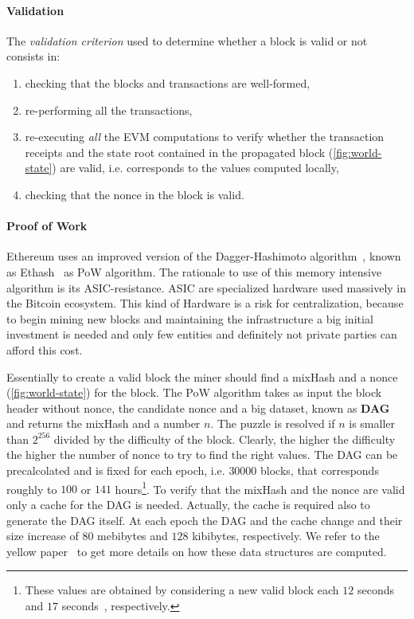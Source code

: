 \paragraph{Validation}
The \emph{validation criterion} used to determine whether a block is valid or
not consists in:
\begin{enumerate}
    \item checking that the blocks and transactions are well-formed,
    \item re-performing all the transactions,
    \item re-executing \emph{all} the EVM computations to verify whether the
    transaction receipts and the state root contained in the propagated block
    (\autoref{fig:world-state}) are valid, i.e. corresponds to the values
    computed locally,
    \item checking that the nonce in the block is valid.
\end{enumerate}

\paragraph{Proof of Work}
Ethereum uses an improved version of the
Dagger-Hashimoto algorithm~\cite{bib:dagger-hashimoto}, known as
Ethash~\cite[Appendix J]{wood2018ethereum} as PoW algorithm.
The rationale to use of this memory intensive algorithm is its
ASIC-resistance. ASIC are specialized hardware used massively in the Bitcoin
ecosystem. This kind of Hardware is a risk for centralization,
because to begin mining new blocks and maintaining the infrastructure a big
initial investment is needed and only few entities and definitely not private
parties can afford this cost.

Essentially to create a valid block the miner should find a mixHash and
a nonce (\autoref{fig:world-state}) for the block.
The PoW algorithm takes as input the block header without nonce,
the candidate nonce and a big dataset, known as \textbf{DAG} and
returns the mixHash and a number $n$. The puzzle is resolved if
$n$ is smaller than $2^{256}$ divided by the difficulty of the block. Clearly,
the higher the difficulty the higher the number of nonce to try to find the
right values. The DAG can be precalcolated and is fixed for each epoch, i.e.
$30000$ blocks, that corresponds roughly to $100$ or $141$ hours\footnote{
These values are obtained by considering a new valid block each $12$
seconds~\cite{bib:} and $17$ seconds~\cite{bib:solidity}, respectively.}. To
verify that the mixHash and the nonce are valid only a cache for the DAG is
needed. Actually, the cache is required also to generate the DAG itself.
At each epoch the DAG and the cache change and their size increase of
$80$ mebibytes and $128$ kibibytes, respectively.
We refer to the yellow paper~\cite[Appendix J]{wood2018ethereum} to get more
details on how these data structures are computed.



